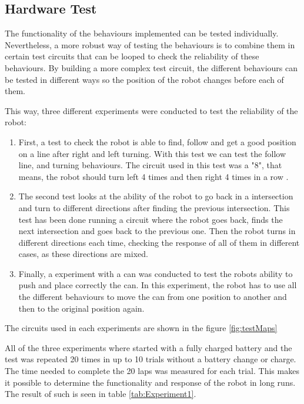 
\subsection{Hardware Test}

The functionality of the behaviours implemented can be tested individually.
Nevertheless, a more robust way of testing the behaviours is to combine them in certain test circuits that can be looped to check the reliability of these behaviours.
By building a more complex test circuit, the different behaviours can be tested in different ways so the position of the robot changes before each of them.

This way, three different experiments were conducted to test the reliability of the robot:

\begin{enumerate}
	\item First, a test to check the robot is able to find, follow and get a good position on a line after right and left turning. 
With this test we can test the follow line, and turning behaviours.
The circuit used in this test was a "8", that means, the robot should turn left 4 times and then right 4 times in a row
.

	\item The second test looks at the ability of the robot to go back in a intersection and turn to different directions after finding the previous intersection.
This test has been done running a circuit where the robot goes back, finds the next intersection and goes back to the previous one. 
Then the robot turns in different directions each time, checking the response of all of them in different cases, as these directions are mixed.

	\item Finally, a experiment with a can was conducted to test the robots ability to push and place correctly the can.
In this experiment, the robot has to use all the different behaviours to move the can from one position to another and then to the original position again.

\end{enumerate}

The circuits used in each experiments are shown in the figure \ref{fig:testMaps}

All of the three experiments where started with a fully charged battery and the test was repeated 20 times in up to 10 trials without a battery change or charge.
The time needed to complete the 20 laps was measured for each trial.
This makes it possible to determine the functionality and response of the robot in long runs.
The result of such is seen in table \ref{tab:Experiment1}.

